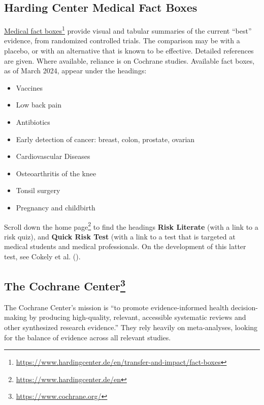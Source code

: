 \documentclass[
  10ptls,
  b5paper]{book}
\providecommand{\tightlist}{%
  \setlength{\itemsep}{0pt}\setlength{\parskip}{0pt}}
\begin{document}
\subsection*{Harding Center Medical Fact Boxes}\label{harding-center-medical-fact-boxes}

\href{https://www.hardingcenter.de/en/transfer-and-impact/fact-boxes}{Medical fact boxes}\footnote{\url{https://www.hardingcenter.de/en/transfer-and-impact/fact-boxes}} provide visual and tabular summaries of the current ``best'' evidence, from randomized controlled trials. The comparison may be with a placebo, or with an alternative that is known to be effective. Detailed references are given. Where available, reliance is on Cochrane studies. Available fact boxes, as of March 2024, appear under the headings:

\begin{itemize}
\tightlist
\item
  Vaccines
\item
  Low back pain
\item
  Antibiotics
\item
  Early detection of cancer: breast, colon, prostate, ovarian
\item
  Cardiovascular Diseases
\item
  Osteoarthritis of the knee
\item
  Tonsil surgery
\item
  Pregnancy and childbirth
\end{itemize}

Scroll down the home page\footnote{\url{https://www.hardingcenter.de/en}} to find the headings \textbf{Risk Literate} (with a link to a risk quiz), and \textbf{Quick Risk Test} (with a link to a test that is targeted at medical students and medical professionals. On the development of this latter test, see Cokely et al. ().

\subsection*{\texorpdfstring{The Cochrane Center\footnote{\url{https://www.cochrane.org/}}}{The Cochrane Center}}\label{the-cochrane-center04-medical-4}

The Cochrane Center's mission is ``to promote evidence-informed health decision-making by producing high-quality, relevant, accessible systematic reviews and other synthesized research evidence.'' They rely heavily on meta-analyses, looking for the balance of evidence across all relevant studies.
\end{document}
